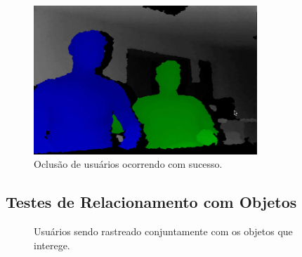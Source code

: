 		
		\begin{figure}[H]
			\begin{center}
				\includegraphics[width=0.75\textwidth]{figuras/5.Testes/oclusao/oclusao_corretamente.png}
			\end{center}
			\caption{Oclusão de usuários ocorrendo com sucesso.}
			\label{fig:testes_oclusao_sucesso}
		\end{figure}
		
	
	\subsection{Testes de Relacionamento com Objetos}
	
		\begin{figure}[H]
			\begin{center}
			\end{center}
			\caption{Usuários sendo rastreado conjuntamente com os objetos que interege.}
			\label{fig:testes_relacionamento_com_objetos}
		\end{figure}
		
